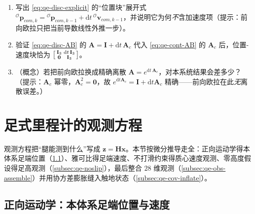 \begin{practice}
\begin{enumerate}
  \item 写出 \cref{eq:qe-disc-explicit} 的“位置块”展开式 ${}^{\mathcal{O}}\boldsymbol p_{com,k}={}^{\mathcal{O}}\boldsymbol p_{com,k-1}+\mathrm{d}t\,{}^{\mathcal{O}}\boldsymbol v_{com,k-1}$，并说明它为何\emph{不}含加速度项（提示：前向欧拉只把当前导数线性外推一步）。
  \item 验证 \cref{eq:qe-disc-AB} 的 $\mathbf{A}=\mathbf{I}+\mathrm{d}t\,\mathbf{A}_c$ 代入 \cref{eq:qe-cont-AB} 的 $\mathbf{A}_c$ 后，位置-速度块恰为 $\begin{bsmallmatrix}\mathbf{I}_3&\mathrm{d}t\,\mathbf{I}_3\\\mathbf{0}&\mathbf{I}_3\end{bsmallmatrix}$。
  \item （概念）若把前向欧拉换成精确离散 $\mathbf{A}=e^{\mathrm{d}t\,\mathbf{A}_c}$，对本系统结果会差多少？（提示：$\mathbf{A}_c$ 幂零，$\mathbf{A}_c^2=\mathbf{0}$，故 $e^{\mathrm{d}t\mathbf{A}_c}=\mathbf{I}+\mathrm{d}t\mathbf{A}_c$ 精确——前向欧拉在此\emph{无}离散误差。）
\end{enumerate}
\end{practice}

\section{足式里程计的观测方程}
\label{sec:qe-obs}

观测方程把“腿能测到什么”写成 $\boldsymbol z=\mathbf{H}\boldsymbol x$。本节按微分推导走全：正向运动学得本体系足端位置（\cref{subsec:qe-fk}）、雅可比得足端速度、不打滑约束得质心速度观测、零高度假设得足高观测（\cref{subsec:qe-noslip}），最后整合 $28$ 维观测（\cref{subsec:qe-obs-assemble}）并用协方差膨胀缝入触地状态（\cref{subsec:qe-cov-inflate}）。

\subsection{正向运动学：本体系足端位置与速度}
\label{subsec:qe-fk}


